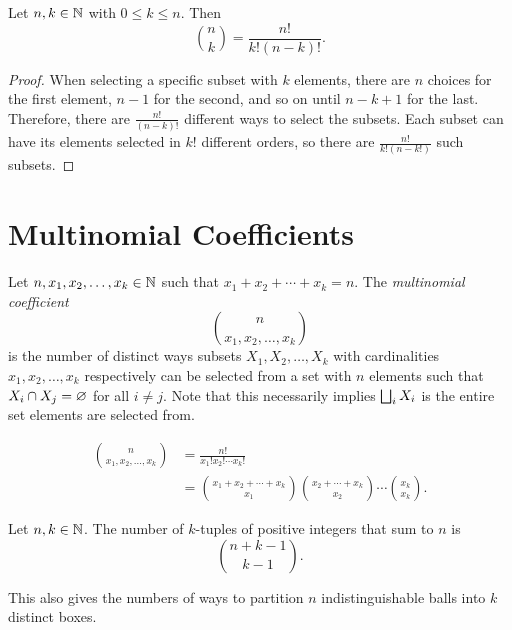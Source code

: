 \begin{prop}
    Let $n, k \in \mathbb{N}$ with $0 \leq k \leq n$. Then \[\binom{n}{k} = \frac{n!}{k!(n-k)!}.\]
\end{prop}

\begin{proof}
    When selecting a specific subset with $k$ elements, there are $n$ choices for the first element, $n-1$ for the second, and so on until $n-k+1$ for the last. Therefore, there are $\frac{n!}{(n-k)!}$ different ways to select the subsets. Each subset can have its elements selected in $k!$ different orders, so there are $\frac{n!}{k!(n-k!)}$ such subsets.
\end{proof}

\section{Multinomial Coefficients}

\begin{defn}
    Let $n, x_1, x_2, \ldots, x_k \in \mathbb{N}$ such that $x_1 + x_2 + \cdots + x_k = n$. The \emph{multinomial coefficient} \[\binom{n}{x_1, x_2, \ldots, x_k}\] is the number of distinct ways subsets $X_1, X_2, \ldots, X_k$ with cardinalities $x_1, x_2, \ldots, x_k$ respectively can be selected from a set with $n$ elements such that $X_i \cap X_j = \varnothing$ for all $i \neq j$. Note that this necessarily implies $\bigsqcup_{i}X_i$ is the entire set elements are selected from.
\end{defn}

\begin{prop}
    \begin{align*}
        \binom{n}{x_1, x_2, \ldots, x_k} &= \frac{n!}{x_1!x_2!\cdots x_k!} \\ &= \binom{x_1 + x_2 + \cdots + x_k}{x_1}\binom{x_2 + \cdots + x_k}{x_2}\cdots\binom{x_k}{x_k}.
    \end{align*}
\end{prop}

\begin{prop}
    Let $n, k \in \mathbb{N}$. The number of $k$-tuples of positive integers that sum to $n$ is
    \[\binom{n + k - 1}{k - 1}.\]
\end{prop}

\begin{rmk}
    This also gives the numbers of ways to partition $n$ indistinguishable balls into $k$ distinct boxes.
\end{rmk}

